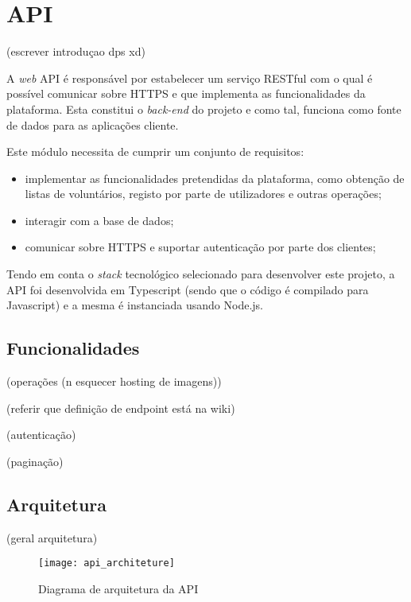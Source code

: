 \section{API}

(escrever introduçao dps xd)

\medskip \par

A \textit{web} API é responsável por estabelecer um serviço RESTful com o qual é possível comunicar sobre HTTPS e que implementa as funcionalidades da plataforma. Esta constitui o \textit{back-end} do projeto e como tal, funciona como fonte de dados para as aplicações cliente.

\medskip \par

Este módulo necessita de cumprir um conjunto de requisitos:

\begin{itemize}
	\item implementar as funcionalidades pretendidas da plataforma, como obtenção de listas de voluntários, registo por parte de utilizadores e outras operações;
	\item interagir com a base de dados;
	\item comunicar sobre HTTPS e suportar autenticação por parte dos clientes;
\end{itemize}

\medskip \par

Tendo em conta o \textit{stack} tecnológico selecionado para desenvolver este projeto, a API foi  desenvolvida em Typescript (sendo que o código é compilado para Javascript) e a mesma é instanciada usando Node.js.

\subsection{Funcionalidades}

(operações (n esquecer hosting de imagens))

(referir que definição de endpoint está na wiki)

(autenticação)

(paginação)

\subsection{Arquitetura}

(geral arquitetura)

\begin{figure}[h]
	\centering
	\texttt{[image: api\_architeture]}
	\caption{Diagrama de arquitetura da API}
\end{figure}

